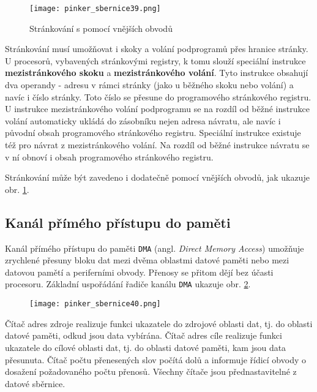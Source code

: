       \begin{figure}[ht!] %
        \centering
        \texttt{[image: pinker\_sbernice39.png]}
        \caption{Stránkování s pomocí vnějších obvodů}
        \label{MIT:fig_sbernice39}
      \end{figure}  
      
      Stránkování musí umožňovat i skoky a volání podprogramů přes hranice stránky. U procesorů, 
      vybavených stránkovými registry, k tomu slouží speciální instrukce \textbf{mezistránkového 
      skoku} a \textbf{mezistránkového volání}. Tyto instrukce obsahují dva operandy - adresu v 
      rámci stránky (jako u běžného skoku nebo volání) a navíc i číslo stránky. Toto číslo se 
      přesune do programového stránkového registru. U instrukce mezistránkového volání podprogramu 
      se na rozdíl od běžné instrukce volání automaticky ukládá do zásobníku nejen adresa návratu, 
      ale navíc i původní obsah programového stránkového registru. Speciální instrukce existuje též 
      pro návrat z mezistránkového volání. Na rozdíl od běžné instrukce návratu se v ní obnoví i 
      obsah programového stránkového registru.
      
      Stránkování může být zavedeno i dodatečně pomocí vnějších obvodů, jak ukazuje obr. 
      \ref{MIT:fig_sbernice39}.
      
    \subsection{Kanál přímého přístupu do paměti}\label{MIT:chap_DMA}
      Kanál přímého přístupu do paměti \texttt{DMA} (angl. \emph{Direct Memory Access}) umožňuje 
      zrychlené přesuny bloku dat mezi dvěma oblastmi datové paměti nebo mezi datovou pamětí a 
      periferními obvody. Přenosy se přitom dějí bez účasti procesoru. Základní uspořádání řadiče 
      kanálu \texttt{DMA} ukazuje obr. \ref{MIT:fig_sbernice40}.
      
      \begin{figure}[ht!] %
        \centering
        \texttt{[image: pinker\_sbernice40.png]}
        \caption{ }
        \label{MIT:fig_sbernice40}
      \end{figure}
      
      Čítač adres zdroje realizuje funkci ukazatele do zdrojové oblasti dat, tj. do oblasti datové 
      paměti, odkud jsou data vybírána. Čítač adres cíle realizuje funkci ukazatele do cílové 
      oblasti dat, tj. do oblasti datové paměti, kam jsou data přesunuta. Čítač počtu přenesených 
      slov počítá dolů a informuje řídicí obvody o dosažení požadovaného počtu přenosů. Všechny 
      čítače jsou přednastavitelné z datové sběrnice.
      
